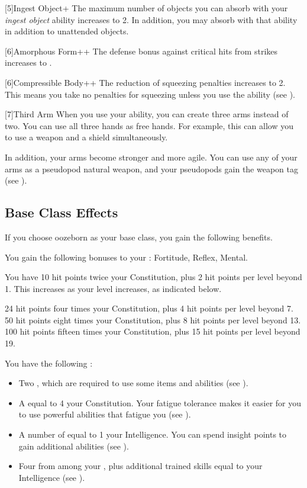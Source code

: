 [5]{Ingest Object+} The maximum number of objects you can absorb with your \textit{ingest object} ability increases to 2.
In addition, you may absorb  with that ability in addition to unattended objects.

[6]{Amorphous Form++} The defense bonus against critical hits from strikes increases to .

[6]{Compressible Body++} The reduction of squeezing penalties increases to 2.
This means you take no penalties for squeezing unless you use the  ability (see ).

[7]{Third Arm} When you use your  ability, you can create three arms instead of two.
You can use all three hands as free hands.
For example, this can allow you to use a  weapon and a shield simultaneously.

In addition, your arms become stronger and more agile.
You can use any of your arms as a pseudopod natural weapon, and your pseudopods gain the  weapon tag (see ).

\subsection{Base Class Effects}
If you choose oozeborn as your base class, you gain the following benefits.

You gain the following bonuses to your :  Fortitude,  Reflex,  Mental.

You have 10 hit points \add twice your Constitution, plus 2 hit points per level beyond 1.
This increases as your level increases, as indicated below.
\begin{itemize}
	 24 hit points \add four times your Constitution, plus 4 hit points per level beyond 7.
	 50 hit points \add eight times your Constitution, plus 8 hit points per level beyond 13.
	 100 hit points \add fifteen times your Constitution, plus 15 hit points per level beyond 19.
\end{itemize}

 You have the following :
\begin{itemize}
	\item Two , which are required to use some items and abilities (see ).
	\item A  equal to 4 \add your Constitution.
	      Your fatigue tolerance makes it easier for you to use powerful abilities that fatigue you (see ).
	\item A number of  equal to 1 \add your Intelligence.
	      You can spend insight points to gain additional abilities (see ).
	\item Four  from among your , plus additional trained skills equal to your Intelligence (see ).
\end{itemize}

